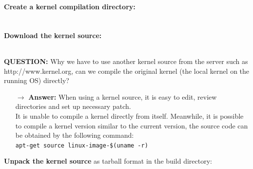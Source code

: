 \documentclass[a4paper]{article}
\begin{document}
\textbf{Create a kernel compilation directory:}\\
\noindent{}\\
\\
\textbf{Download the kernel source:}\\
\noindent{}\\
\newpage
\begin{mdframed}[hidealllines=true,backgroundcolor=blue!10]
\textbf{QUESTION:} Why we have to use another kernel source from the server such as\\
http://www.kernel.org, can we compile the original kernel (the local kernel on the running OS) directly?
\begin{itemize}
\item[$\rightarrow$] \textbf{Answer:} When using a kernel source, it is easy to edit, review directories and set up necessary patch.\\
It is unable to compile a kernel directly from itself. Meanwhile, it is possible to compile a kernel version similar to the current version, the source code can be obtained by the following command:\\
\texttt{apt-get source linux-image-\$(uname -r)}
\end{itemize}
\end{mdframed}
\textbf{Unpack the kernel source} as tarball format in the build directory: \\
\noindent{}\\
\end{document}
